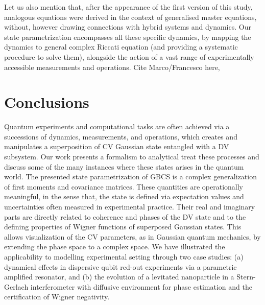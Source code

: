 \documentclass[%
reprint,
superscriptaddress,
nofootinbib,
 amsmath,amssymb,
prx,
floatfix,
]{revtex4-2}
\begin{document}
Let us also mention that, after the appearance of the first version of this study, analogous equations were derived in the context of generalised master equations, without, however drawing connections with hybrid systems and dynamics.
Our state parametrization encompasses all these specific dynamics, by mapping the dynamics to general complex Riccati equation (and providing a systematic procedure to solve them), alongside the action of a vast range of experimentally accessible measurements and operations. 
\textcolor{blue}{}Cite Marco/Francesco here,
~\cite{serafini_minimum_2004,Entanglement_Wahyu_2008}
~\cite{utami_entanglement_2008}



\section{Conclusions\label{sec:conclusion}}


Quantum experiments and computational tasks are often achieved via a successions of dynamics, measurements, and operations, which creates and manipulates a superposition of CV Gaussian state entangled with a DV subsystem. Our work presents a formalism to analytical treat these processes and discuss some of the many instances where these states arises in the quantum world. The presented state parametrization of GBCS is a complex generalization of first moments and covariance matrices. These quantities are operationally meaningful, in the sense that, the state is defined via expectation values and uncertainties often measured in experimental practice. Their real and imaginary parts are directly related to coherence and phases of the DV state and to the defining properties of Wigner functions of superposed Gaussian states. This allows visualization of the CV parameters, as in Gaussian quantum mechanics, by extending the phase space to a complex space. We have illustrated the applicability to modelling experimental setting through two case studies: (a) dynamical effects in dispersive qubit red-out experiments via a parametric amplified resonator, and (b) the evolution of a levitated nanoparticle in a Stern-Gerlach interferometer with diffusive environment for phase estimation and the certification of Wigner negativity.
\end{document}
